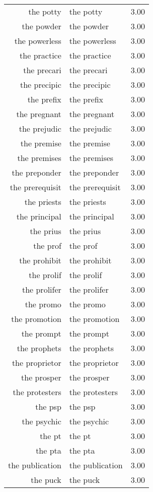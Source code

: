 \begin{table}[ht]
\begin{tabular}{rlr}
  the potty & the potty & 3.00 \\ 
  the powder & the powder & 3.00 \\ 
  the powerless & the powerless & 3.00 \\ 
  the practice & the practice & 3.00 \\ 
  the precari & the precari & 3.00 \\ 
  the precipic & the precipic & 3.00 \\ 
  the prefix & the prefix & 3.00 \\ 
  the pregnant & the pregnant & 3.00 \\ 
  the prejudic & the prejudic & 3.00 \\ 
  the premise & the premise & 3.00 \\ 
  the premises & the premises & 3.00 \\ 
  the preponder & the preponder & 3.00 \\ 
  the prerequisit & the prerequisit & 3.00 \\ 
  the priests & the priests & 3.00 \\ 
  the principal & the principal & 3.00 \\ 
  the prius & the prius & 3.00 \\ 
  the prof & the prof & 3.00 \\ 
  the prohibit & the prohibit & 3.00 \\ 
  the prolif & the prolif & 3.00 \\ 
  the prolifer & the prolifer & 3.00 \\ 
  the promo & the promo & 3.00 \\ 
  the promotion & the promotion & 3.00 \\ 
  the prompt & the prompt & 3.00 \\ 
  the prophets & the prophets & 3.00 \\ 
  the proprietor & the proprietor & 3.00 \\ 
  the prosper & the prosper & 3.00 \\ 
  the protesters & the protesters & 3.00 \\ 
  the psp & the psp & 3.00 \\ 
  the psychic & the psychic & 3.00 \\ 
  the pt & the pt & 3.00 \\ 
  the pta & the pta & 3.00 \\ 
  the publication & the publication & 3.00 \\ 
  the puck & the puck & 3.00 \\ 

\end{tabular}
\end{table}
